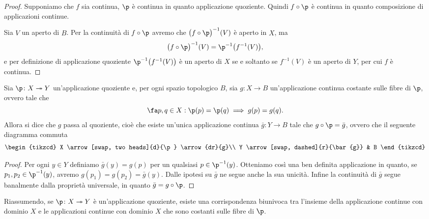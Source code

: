 \begin{proof}
	\graffito{\(\Rightarrow)\)}Supponiamo che \(f\) sia continua, \(\p\) è continua in quanto applicazione quoziente.
	Quindi \(f\circ \p\) è continua in quanto composizione di applicazioni continue.

	\graffito{\(\Leftarrow)\)}Sia \(V\) un aperto di \(B\).
	Per la continuità di \(f\circ \p\) avremo che \(\big(f\circ \p\big)^{-1}(V)\) è aperto in \(X\), ma
	\[
		\big(f\circ \p\big)^{-1}(V) = \p^{-1}\big(f^{-1}(V)\big),
	\]
	e per definizione di applicazione quoziente \(\p^{-1}\big(f^{-1}(V)\big)\) è un aperto di \(X\) se e soltanto se \(f^{-1}(V)\) è un aperto di \(Y\), per cui \(f\) è continua.
\end{proof}

\begin{cor}
	Sia \(\p\colon X \twoheadrightarrow Y\) un'applicazione quoziente e, per ogni spazio topologico \(B\), sia \(g\colon X \to B\) un'applicazione continua costante sulle fibre di \(\p\), ovvero tale che
	\[
		\fa p,q\in X:\p(p) = \p(q) \implies g(p)=g(q).
	\]
	Allora si dice che \(g\) passa al quoziente, cioè che esiste un'unica applicazione continua \(\bar{g}\colon Y \to B\) tale che \(g\circ \p = \bar{g}\), ovvero che il seguente diagramma commuta
	\[
		\begin{tikzcd}
			X \arrow[swap, two heads]{d}{\p} \arrow{dr}{g}\\
			Y \arrow[swap, dashed]{r}{\bar{g}} & B
		\end{tikzcd}
	\]
\end{cor}

\begin{proof}
	Per ogni \(y\in Y\) definiamo \(\bar{g}(y) = g(p)\) per un qualsiasi \(p\in \p^{-1}(y)\).
	Otteniamo così una ben definita applicazione in quanto, se \(p_1,p_2 \in \p^{-1}(y)\), avremo \(g(p_1)=g(p_2)=\bar{g}(y)\).
	Dalle ipotesi su \(\bar{g}\) ne segue anche la sua unicità.
	Infine la continuità di \(\bar{g}\) segue banalmente dalla proprietà universale, in quanto \(\bar{g}=g \circ \p\).
\end{proof}

\begin{oss}
	Riassumendo, se \(\p\colon X \twoheadrightarrow Y\) è un'applicazione quoziente, esiste una corrispondenza biunivoca tra l'insieme della applicazione continue con dominio \(X\) e le applicazioni continue con dominio \(X\) che sono costanti sulle fibre di \(\p\).
\end{oss}


